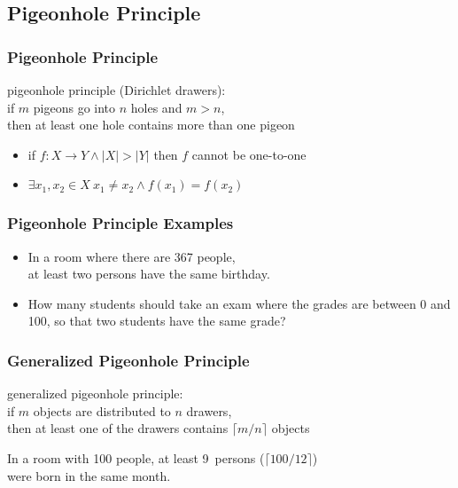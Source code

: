 \documentclass[dvipsnames]{beamer}
\begin{document}
\subsection{Pigeonhole Principle}

\begin{frame}
  \frametitle{Pigeonhole Principle}

  \begin{definition}
    \alert{pigeonhole principle} (Dirichlet drawers):\\
    if $m$ pigeons go into $n$ holes and $m>n$,\\
    then at least one hole contains more than one pigeon
  \end{definition}

  \pause
  \begin{itemize}
    \item if $f: X \rightarrow Y \wedge |X|>|Y|$ then $f$ cannot be one-to-one

    \item $\exists x_1,x_2 \in X~x_1 \neq x_2 \wedge f(x_1)=f(x_2)$
  \end{itemize}
\end{frame}

\begin{frame}
  \frametitle{Pigeonhole Principle Examples}

  \begin{example}
    \begin{itemize}
      \item In a room where there are 367 people,\\
        at least two persons have the same birthday.

      \pause
      \item How many students should take an exam where the grades are between
        0 and 100, so that two students have the same grade?
    \end{itemize}
  \end{example}
\end{frame}

\begin{frame}
  \frametitle{Generalized Pigeonhole Principle}

  \begin{definition}
    \alert{generalized pigeonhole principle}:\\
    if $m$ objects are distributed to $n$ drawers,\\
    then at least one of the drawers contains $\lceil m / n \rceil$ objects
  \end{definition}

  \pause
  \begin{example}
    In a room with 100 people, at least 9~persons ($\lceil 100 / 12 \rceil$)\\
    were born in the same month.
  \end{example}
\end{frame}
\end{document}
